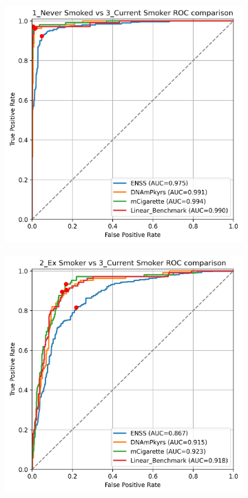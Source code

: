 \documentclass{article} %
\begin{document}
\begin{figure}[p]
    \centering
    \begin{subfigure}{0.48\linewidth}
        \centering
        \includegraphics[width=\linewidth]{comparison_1v3.png}
    \end{subfigure}
    \hfill
    \begin{subfigure}{0.48\linewidth}
        \centering
        \includegraphics[width=\linewidth]{comparison_2v3.png}

\end{subfigure}
\end{figure}
\end{document}
